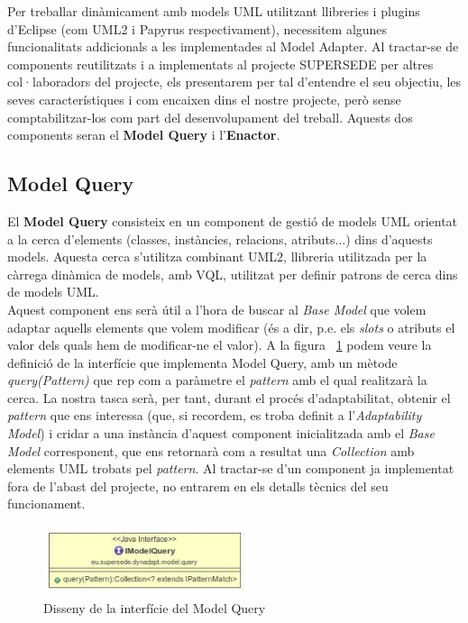 Per treballar dinàmicament amb models UML utilitzant llibreries i plugins d'Eclipse (com UML2 i Papyrus respectivament), necessitem algunes funcionalitats addicionals a les implementades al Model Adapter. Al tractar-se de components reutilitzats i a implementats al projecte SUPERSEDE per altres col·laboradors del projecte, els presentarem per tal d'entendre el seu objectiu, les seves característiques i com encaixen dins el nostre projecte, però sense comptabilitzar-los com part del desenvolupament del treball. Aquests dos components seran el \textbf{Model Query} i l'\textbf{Enactor}.

\subsection{Model Query}

El \textbf{Model Query} consisteix en un component de gestió de models UML orientat a la cerca d'elements (classes, instàncies, relacions, atributs...) dins d'aquests models. Aquesta cerca s'utilitza combinant UML2, llibreria utilitzada per la càrrega dinàmica de models, amb VQL, utilitzat per definir patrons de cerca dins de models UML.\\

Aquest component ens serà útil a l'hora de buscar al \textit{Base Model} que volem adaptar aquells elements que volem modificar (és a dir, p.e. els \textit{slots} o atributs el valor dels quals hem de modificar-ne el valor). A la figura ~\ref{fig:Figura23} podem veure la definició de la interfície que implementa Model Query, amb un mètode \textit{query(Pattern)} que rep com a paràmetre el \textit{pattern} amb el qual realitzarà la cerca. La nostra tasca serà, per tant, durant el procés d'adaptabilitat, obtenir el \textit{pattern} que ens interessa (que, si recordem, es troba definit a l'\textit{Adaptability Model}) i cridar a una instància d'aquest component inicialitzada amb el \textit{Base Model} corresponent, que ens retornarà com a resultat una \textit{Collection} amb elements UML trobats pel \textit{pattern}. Al tractar-se d'un component ja implementat fora de l'abast del projecte, no entrarem en els detalls tècnics del seu funcionament.

\begin{figure}
\centering
\includegraphics[width=6cm]{Figures/Figure23}
\decoRule
\caption{Disseny de la interfície del Model Query}
\label{fig:Figura23}
\end{figure}

